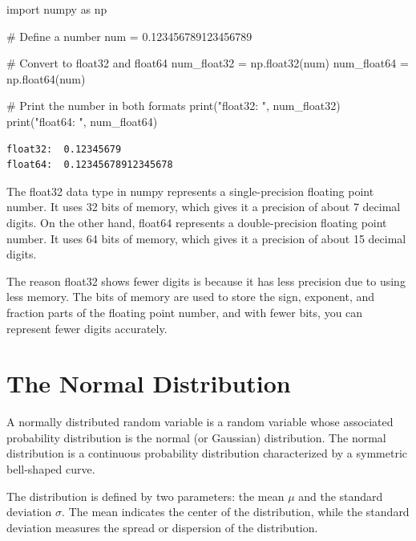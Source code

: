 \documentclass[
  letterpaper,
  DIV=11,
  numbers=noendperiod]{scrreprt}
\newenvironment{Shaded}{\begin{snugshade}}{\end{snugshade}}
\newcommand{\BuiltInTok}[1]{\textcolor[rgb]{0.00,0.23,0.31}{#1}}
\newcommand{\CommentTok}[1]{\textcolor[rgb]{0.37,0.37,0.37}{#1}}
\newcommand{\FloatTok}[1]{\textcolor[rgb]{0.68,0.00,0.00}{#1}}
\newcommand{\ImportTok}[1]{\textcolor[rgb]{0.00,0.46,0.62}{#1}}
\newcommand{\NormalTok}[1]{\textcolor[rgb]{0.00,0.23,0.31}{#1}}
\newcommand{\OperatorTok}[1]{\textcolor[rgb]{0.37,0.37,0.37}{#1}}
\newcommand{\StringTok}[1]{\textcolor[rgb]{0.13,0.47,0.30}{#1}}
\begin{document}
\begin{Shaded}
\begin{Highlighting}[]
\ImportTok{import}\NormalTok{ numpy }\ImportTok{as}\NormalTok{ np}

\CommentTok{\# Define a number}
\NormalTok{num }\OperatorTok{=} \FloatTok{0.123456789123456789}

\CommentTok{\# Convert to float32 and float64}
\NormalTok{num\_float32 }\OperatorTok{=}\NormalTok{ np.float32(num)}
\NormalTok{num\_float64 }\OperatorTok{=}\NormalTok{ np.float64(num)}

\CommentTok{\# Print the number in both formats}
\BuiltInTok{print}\NormalTok{(}\StringTok{"float32: "}\NormalTok{, num\_float32)}
\BuiltInTok{print}\NormalTok{(}\StringTok{"float64: "}\NormalTok{, num\_float64)}
\end{Highlighting}
\end{Shaded}

\begin{verbatim}
float32:  0.12345679
float64:  0.12345678912345678
\end{verbatim}

The float32 data type in numpy represents a single-precision floating
point number. It uses 32 bits of memory, which gives it a precision of
about 7 decimal digits. On the other hand, float64 represents a
double-precision floating point number. It uses 64 bits of memory, which
gives it a precision of about 15 decimal digits.

The reason float32 shows fewer digits is because it has less precision
due to using less memory. The bits of memory are used to store the sign,
exponent, and fraction parts of the floating point number, and with
fewer bits, you can represent fewer digits accurately.

\hypertarget{the-normal-distribution}{%
\section{The Normal Distribution}\label{the-normal-distribution}}

A normally distributed random variable is a random variable whose
associated probability distribution is the normal (or Gaussian)
distribution. The normal distribution is a continuous probability
distribution characterized by a symmetric bell-shaped curve.

The distribution is defined by two parameters: the mean \(\mu\) and the
standard deviation \(\sigma\). The mean indicates the center of the
distribution, while the standard deviation measures the spread or
dispersion of the distribution.
\end{document}
